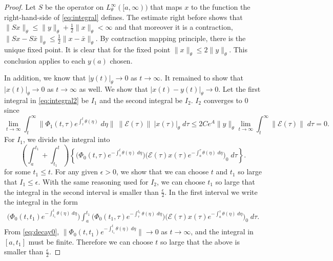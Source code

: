 \documentclass[a4paper,11pt]{article}
\newcommand{\E}{\mathcal{E}}
\theoremstyle{remark}
\begin{document}
\begin{proof}
Let $S$ be the operator on $L^\infty_{\theta}([a,\infty))$ that maps $x$ to the function the right-hand-side of \eqref{eq:integral} defines. The estimate right before shows that $\|Sx\|_\theta \le \|y\|_\theta + \frac{1}{2} \|x\|_\theta < \infty$ and that moreover it is a contraction, $\|Sx - S\bar{x}\|_\theta \le \frac{1}{2} \|x-\bar{x}\|_\theta$. By contraction mapping principle, there is the unique fixed point. It is clear that for the fixed point $\|x\|_\theta \le 2\|y\|_\theta$. This conclusion applies to each $y(a)$ chosen.

In addition, we know that $|y(t)|_\theta \rightarrow 0$ as $t \rightarrow \infty$. It remained to show that $|x(t)|_\theta \rightarrow 0$ as $t \rightarrow \infty$ as well. We show that $|x(t)-y(t)|_\theta \rightarrow 0$. Let the first integral in \eqref{eq:integral2} be $I_1$ and the second integral be $I_2$. $I_2$ converges to $0$ since
$$\lim_{t \rightarrow\infty}\int_t^\infty \|\Phi_1(t,\tau)e^{\int_\tau^t \theta(\eta)}\;d\eta\| \: \|\E(\tau)\| \:|x(\tau)|_\theta \; d\tau\le 2C e^A \|y\|_\theta \lim_{t \rightarrow \infty}\int_t^\infty \|\E(\tau)\| \;d\tau = 0.$$
For $I_1$, we divide the integral into 
$$\left(\int_a^{t_1} + \int_{t_1}^t \right) \left\{\big(\Phi_0(t,\tau)e^{-\int_\tau^t \theta(\eta) \;d\eta}\big)\big(\E(\tau) x(\tau)e^{-\int_a^\tau \theta(\eta) \;d\eta}\big)_0 \;d\tau\right\}.$$
for some $t_1 \le t$. For any given $\epsilon>0$, we show that we can choose $t$ and $t_1$ so large that $I_1 \le \epsilon$. With the same reasoning used for $I_2$, we can choose $t_1$ so large that the integral in the second interval is smaller than $ \frac{\epsilon}{2}$. In the first interval we write the integral in the form
\begin{align*}
 \big(\Phi_0(t,t_1)e^{-\int_{t_1}^t \theta(\eta)\;d\eta}\big) \int_a^{t_1} \big(\Phi_0(t_1,\tau)e^{-\int_\tau^{t_1} \theta(\eta) \;d\eta}\big)\big(\E(\tau) x(\tau)e^{-\int_a^\tau \theta(\eta) \;d\eta}\big)_0 \;d\tau.
\end{align*}
From \eqref{eq:decay0}, $\|\Phi_0(t,t_1)e^{-\int_{t_1}^t \theta(\eta)\;d\eta}\| \rightarrow 0$ as $t \rightarrow \infty$, and the integral in $[a,t_1]$ must be finite. Therefore we can choose $t$ so large that the above is smaller than $ \frac{\epsilon}{2}$.
\end{proof}
\end{document}

